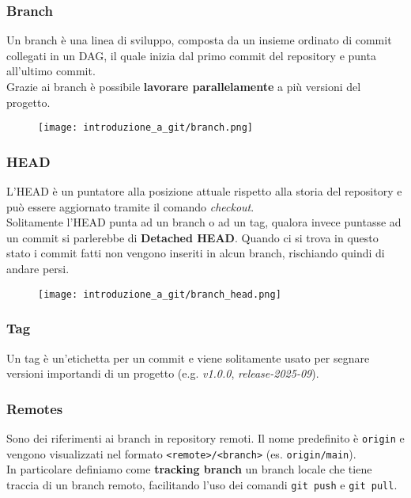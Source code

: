 \documentclass[12pt]{article}
\begin{document}
    \subsubsection{Branch}
    Un branch è una linea di sviluppo, composta da un insieme ordinato di commit collegati in un DAG, il quale inizia dal primo commit del repository e punta all'ultimo commit.\\
    Grazie ai branch è possibile \textbf{lavorare parallelamente} a più versioni del progetto.
    \begin{figure}[H]
      \centering
      \texttt{[image: introduzione\_a\_git/branch.png]}
    \end{figure}

    \subsubsection{HEAD}
    L'HEAD è un puntatore alla posizione attuale rispetto alla storia del repository e può essere aggiornato tramite il comando \textit{checkout}.\\
    Solitamente l'HEAD punta ad un branch o ad un tag, qualora invece puntasse ad un commit si parlerebbe di \textbf{Detached HEAD}. Quando ci si trova in questo stato i commit fatti non vengono inseriti in alcun branch, rischiando quindi di andare persi.
    \begin{figure}[H]
      \centering
      \texttt{[image: introduzione\_a\_git/branch\_head.png]}
    \end{figure}

    \subsubsection{Tag}
    Un tag è un'etichetta per un commit e viene solitamente usato per segnare versioni importandi di un progetto (e.g. \textit{v1.0.0}, \textit{release-2025-09}).

    \subsubsection{Remotes}
    Sono dei riferimenti ai branch in repository remoti. Il nome predefinito è \texttt{origin} e vengono visualizzati nel formato \texttt{<remote>/<branch>} (es. \texttt{origin/main}).\\
    In particolare definiamo come \textbf{tracking branch} un branch locale che tiene traccia di un branch remoto, facilitando l'uso dei comandi \texttt{git push} e \texttt{git pull}.
\end{document}
